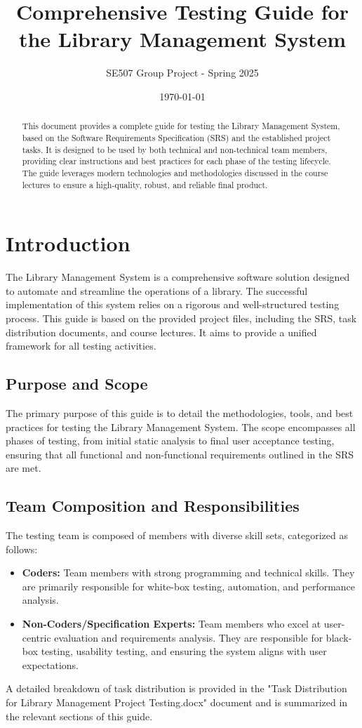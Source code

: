 \documentclass{article}
\title{Comprehensive Testing Guide for the Library Management System}
\author{SE507 Group Project - Spring 2025}
\date{\today}
\begin{document}
\maketitle

\begin{abstract}
This document provides a complete guide for testing the Library Management System, based on the Software Requirements Specification (SRS) and the established project tasks. It is designed to be used by both technical and non-technical team members, providing clear instructions and best practices for each phase of the testing lifecycle. The guide leverages modern technologies and methodologies discussed in the course lectures to ensure a high-quality, robust, and reliable final product.
\end{abstract}

\section{Introduction}

The Library Management System is a comprehensive software solution designed to automate and streamline the operations of a library. The successful implementation of this system relies on a rigorous and well-structured testing process. This guide is based on the provided project files, including the SRS, task distribution documents, and course lectures. It aims to provide a unified framework for all testing activities.

\subsection{Purpose and Scope}
The primary purpose of this guide is to detail the methodologies, tools, and best practices for testing the Library Management System. The scope encompasses all phases of testing, from initial static analysis to final user acceptance testing, ensuring that all functional and non-functional requirements outlined in the SRS are met.

\subsection{Team Composition and Responsibilities}
The testing team is composed of members with diverse skill sets, categorized as follows:
\begin{itemize}
    \item \textbf{Coders:} Team members with strong programming and technical skills. They are primarily responsible for white-box testing, automation, and performance analysis.
    \item \textbf{Non-Coders/Specification Experts:} Team members who excel at user-centric evaluation and requirements analysis. They are responsible for black-box testing, usability testing, and ensuring the system aligns with user expectations.
\end{itemize}
A detailed breakdown of task distribution is provided in the "Task Distribution for Library Management Project Testing.docx" document and is summarized in the relevant sections of this guide.
\end{document}
